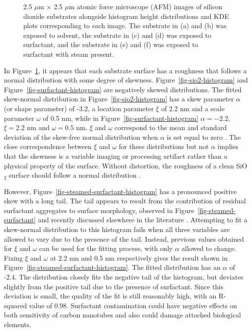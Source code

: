 \documentclass[
  a4paper,
]{scrbook}
\begin{document}
\begin{figure}
\begin{minipage}[t]{0.47\linewidth}
{{}

}

\subcaption{\label{fig-steamed-surfactant-histogram}}
\end{minipage}%

\caption{\label{fig-afm-substrate}2.5 \(\mu\)m \(\times\) 2.5 \(\mu\)m
atomic force microscope (AFM) images of silicon dioxide substrates
alongside histogram height distributions and KDE plots corresponding to
each image. The substrate in (a) and (b) was exposed to solvent, the
substrate in (c) and (d) was exposed to surfactant, and the substrate in
(e) and (f) was exposed to surfactant with steam present.}

\end{figure}

In Figure~\ref{fig-afm-substrate}, it appears that each substrate
surface has a roughness that follows a normal distribution with some
degree of skewness. Figure~\ref{fig-sio2-histogram} and
Figure~\ref{fig-surfactant-histogram} are negatively skewed
distributions. The fitted skew-normal distribution in
Figure~\ref{fig-sio2-histogram} has a skew parameter \(\alpha\) (or
shape parameter) of -3.2, a location parameter \(\xi\) of 2.2 nm and a
scale parameter \(\omega\) of 0.5 nm, while in
Figure~\ref{fig-surfactant-histogram} \(\alpha = -2.2\), \(\xi = 2.2\)
nm and \(\omega = 0.5\) nm. \(\xi\) and \(\omega\) correspond to the
mean and standard deviation of the skew-free normal distribution when
\(\alpha\) is set equal to zero \autocite{Azzalini1999}. The close
correspondence between \(\xi\) and \(\omega\) for these distributions
but not \(\alpha\) implies that the skewness is a variable imaging or
processing artifact rather than a physical property of the surface.
Without distortion, the roughness of a clean SiO\(_2\) surface should
follow a normal distribution \autocite{Velicky2015}.

However, Figure~\ref{fig-steamed-surfactant-histogram} has a pronounced
positive skew with a long tail. The tail appears to result from the
contribution of residual surfactant aggregates to surface morphology,
observed in Figure~\ref{fig-steamed-surfactant} and recently discussed
elsewhere in the literature \autocite{Christensen2022,Vobornik2023}.
Attempting to fit a skew-normal distribution to this histogram fails
when all three variables are allowed to vary due to the presence of the
tail. Instead, previous values obtained for \(\xi\) and \(\omega\) can
be used for the fitting process, with only \(\alpha\) allowed to change.
Fixing \(\xi\) and \(\omega\) at 2.2 nm and 0.5 nm respectively gives
the result shown in Figure~\ref{fig-steamed-surfactant-histogram}. The
fitted distribution has an \(\alpha\) of -2.4. The distribution closely
fits the negative tail of the histogram, but deviates slightly from the
positive tail due to the presence of surfactant. Since this deviation is
small, the quality of the fit is still reasonably high, with an
R-squared value of 0.98. Surfactant contamination could have negative
effects on both sensitivity of carbon nanotubes and also could damage
attached biological elements.
\end{document}
